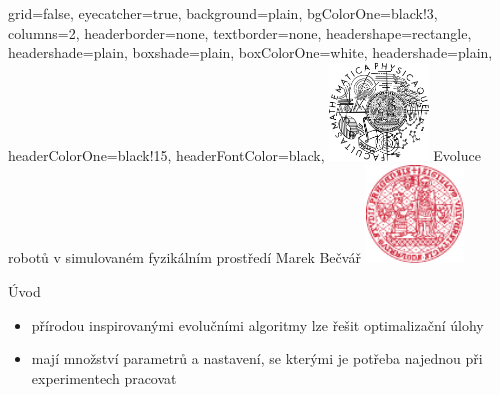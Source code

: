 \documentclass[portrait,a0paper,fontscale=0.25]{baposter}
\begin{document}
\color{black!80} %
\begin{poster}{grid=false,
	eyecatcher=true,
	background=plain,
	bgColorOne=black!3, %
	columns=2,
	headerborder=none,
	textborder=none,
	headershape=rectangle,
	headershade=plain,
	boxshade=plain,
	boxColorOne=white,
	headershade=plain,
	headerColorOne=black!15, %
	headerFontColor=black,
	}%
	{\includegraphics[height=7em]{logos/mff-black.pdf}}
    {Evoluce robotů v simulovaném\vspace*{4px} fyzikálním prostředí}
	{\vspace{1ex} Marek Bečvář}
	{\includegraphics[height=7em]{logos/uk-red.pdf}}


%
%

\begin{posterbox}[column=0,name=uvod]{Úvod}
    \begin{itemize}[leftmargin=*]
    \item přírodou inspirovanými evolučními algoritmy lze řešit optimalizační
        úlohy
    \item mají množství parametrů a nastavení, se kterými je potřeba najednou
        při experimentech pracovat

\end{itemize}


\end{posterbox}


\end{poster}
\end{document}
